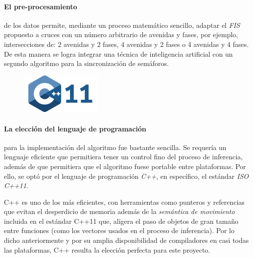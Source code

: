 
\paragraph{El pre-procesamiento} de los datos permite, mediante un proceso matemático sencillo, adaptar el \emph{FIS} propuesto a cruces con un número arbitrario de avenidas y fases, por ejemplo, intersecciones de: 2 avenidas y 2 fases, 4 avenidas y 2 fases o 4 avenidas y 4 fases. De esta manera se logra integrar una técnica de inteligencia artificial con un segundo algoritmo para la sincronización de semáforos.




\begin{figure}
	\includegraphics[width=4cm]{Sources/logo_cpp11.jpg}
\end{figure}

\paragraph{La elección del lenguaje de programación} para la implementación del algoritmo fue bastante sencilla. Se requería un lenguaje eficiente que permitiera tener un control fino del proceso de inferencia, además de que permitiera que el algoritmo fuese portable entre plataformas. Por ello, se optó por el lenguaje de programación \emph{C++}, en específico, el estándar \emph{ISO C++11}.

C++ es uno de los más eficientes, con herramientas como punteros y referencias que evitan el desperdicio de memoria además de la \emph{semántica de movimiento} incluida en el estándar \textsc{C++11} que, aligera el paso de objetos de gran tamaño entre funciones (como los vectores usados en el proceso de inferencia). Por lo dicho anteriormente y por su amplia disponibilidad de compiladores en casi todas las plataformas, C++ resulta la elección perfecta para este proyecto.


